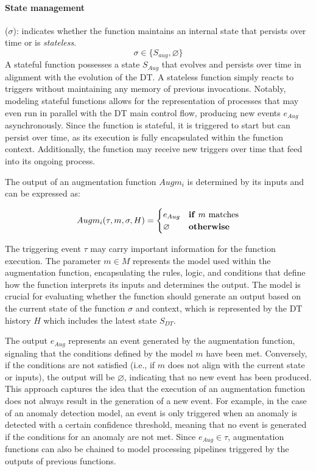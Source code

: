 \paragraph{State management} (\( \sigma \)): indicates whether the function maintains an internal state that persists over time or is \emph{stateless}.
%
\begin{equation}
\sigma \in \{S_{aug}, \varnothing\}
\end{equation}
%
A stateful function possesses a state \( S_{Aug} \) that evolves and persists over time in alignment with the evolution of the \ac{DT}.  
A stateless function simply reacts to triggers without maintaining any memory of previous invocations.  
Notably, modeling stateful functions allows for the representation of processes that may even run in parallel with the \ac{DT} main control flow, producing new events \( e_{Aug} \) asynchronously.  
Since the function is stateful, it is triggered to start but can persist over time, as its execution is fully encapsulated within the function context. Additionally, the function may receive new triggers over time that feed into its ongoing process.

The output of an augmentation function \( Augm_{i} \) is determined by its inputs and can be expressed as:

\begin{equation}
    Augm_{i}(\tau, m, \sigma, H) =
    \begin{cases}
    e_{Aug} & \text{\textbf{if} $m$ matches}\\
    \varnothing & \text{\textbf{otherwise}}
    \end{cases}
\end{equation}

The triggering event $\tau$ may carry important information for the function execution.
The parameter $m \in M$ represents the model used within the augmentation function, encapsulating the rules, logic, and conditions that define how the function interprets its inputs and determines the output.
The model is crucial for evaluating whether the function should generate an output based on the current state of the function $\sigma$ and context, which is represented by the \ac{DT} history $H$ which includes the latest state $S_{DT}$.

The output \( e_{Aug} \) represents an event generated by the augmentation function, signaling that the conditions defined by the model \( m \) have been met. Conversely, if the conditions are not satisfied (i.e., if \( m \) does not align with the current state or inputs), the output will be \( \varnothing \), indicating that no new event has been produced.  
This approach captures the idea that the execution of an augmentation function does not always result in the generation of a new event. For example, in the case of an anomaly detection model, an event is only triggered when an anomaly is detected with a certain confidence threshold, meaning that no event is generated if the conditions for an anomaly are not met.
Since $e_{Aug} \in \tau$, augmentation functions can also be chained to model processing pipelines triggered by the outputs of previous functions.


